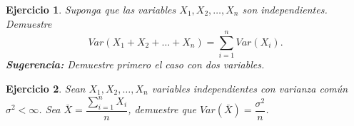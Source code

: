 \documentclass[11pt]{report}
\theoremstyle{break}
\newtheorem{ejercicio}{Ejercicio}[chapter]
\theoremstyle{break}
\begin{document}
\begin{ejercicio}
Suponga que las variables $X_1, X_2, \ldots, X_n$ son independientes. Demuestre
$$
Var(X_1 + X_2 + \ldots + X_n) = \sum_{i=1}^{n}Var(X_i).
$$
\textbf{Sugerencia:} Demuestre primero el caso con dos variables.
\end{ejercicio}

\begin{ejercicio}
Sean $X_1, X_2, \ldots, X_n$ variables independientes con varianza común $\sigma^2 < \infty$. Sea $\bar{X} = \dfrac{\sum_{i=1}^{n} X_i }{n}$, demuestre que $Var(\bar{X}) = \dfrac{\sigma^2}{n}$.
\end{ejercicio}
\end{document}
